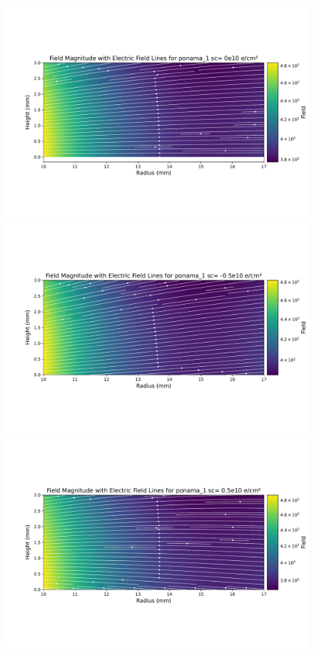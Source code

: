 \begin{figure}
\centering
\includegraphics[trim={1cm 3.5cm 0.2cm 4.0cm},clip,width=0.99\linewidth]{ch3/figs/elect_field_lines_surface_ponama_1_sc_0.pdf}
\includegraphics[trim={1cm 3.5cm 0.2cm 4.0cm},clip,width=0.99\linewidth]{ch3/figs/elect_field_lines_surface_ponama_1_sc_-0.5.pdf}
\includegraphics[trim={1cm 3.5cm 0.2cm 4.0cm},clip,width=0.99\linewidth]{ch3/figs/elect_field_lines_surface_ponama_1_sc_0.5.pdf}

\end{figure}
